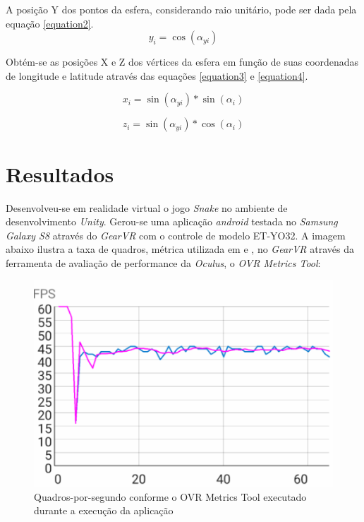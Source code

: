 \documentclass[conference]{IEEEtran}
\begin{document}
A posição Y dos pontos da esfera, considerando raio unitário, pode ser dada pela equação \ref{equation2}.
\begin{equation}
y_{i} = \cos(\alpha_{yi})
\label{equation2}
\end{equation}

Obtém-se as posições X e Z dos vértices da esfera em função de suas coordenadas de longitude e latitude através das equações \ref{equation3} e \ref{equation4}.

\begin{equation}
x_{i} = \sin(\alpha_{yi}) * \sin(\alpha_i)
\label{equation3}
\end{equation}

\begin{equation}
z_{i} = \sin(\alpha_{yi}) * \cos(\alpha_i)
\label{equation4}
\end{equation}

\section{Resultados} \label{sec:results}
Desenvolveu-se em realidade virtual o jogo \textit{Snake} no ambiente de desenvolvimento \textit{Unity}. Gerou-se uma aplicação \textit{android} testada no \textit{Samsung Galaxy S8} através do \textit{GearVR} com o controle de modelo ET-YO32. A imagem abaixo ilustra a taxa de quadros, métrica utilizada em \cite{GPGPUWars} e \cite{GPGPUTechniques}, no \textit{GearVR} através da ferramenta de avaliação de performance da \textit{Oculus}, o \textit{OVR Metrics Tool}:

\begin{figure}[H] 
\centering
\includegraphics[scale=0.5]{VRPerformance}
\caption{Quadros-por-segundo conforme o OVR Metrics Tool executado durante a execução da aplicação} \label{fig:VRPerformance}
\end{figure}
\end{document}
